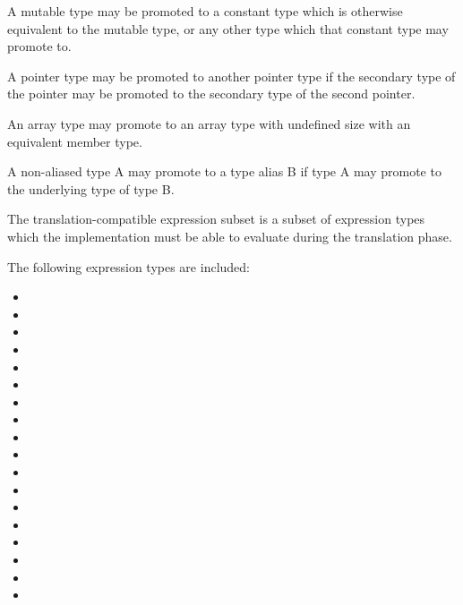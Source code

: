 \specsubitem
A mutable type may be promoted to a constant type which is otherwise equivalent
to the mutable type, or any other type which that constant type may promote to.

\specsubitem
A pointer type may be promoted to another pointer type if the secondary type of
the pointer may be promoted to the secondary type of the second pointer.

\specsubitem
An array type may promote to an array type with undefined size with an
equivalent member type.

\specsubitem
A non-aliased type A may promote to a type alias B if type A may promote to the
underlying type of type B.


The translation-compatible expression subset is a subset of expression types
which the implementation must be able to evaluate during the translation phase.

\specsubitem
The following expression types are included:

\begin{minipage}[t][7cm][b]{\textwidth}
\begin{multicols}{2}
\begin{itemize}
\item {}
\item {}
\item {}
\item {}
\item {}
\item {}
\item {}
\item {}
\item {}
\item {}
\item {}
\item {}
\item {}
\item {}
\item {}
\item {}
\item {}
\item {}
\end{itemize}
\end{multicols}
\end{minipage}


